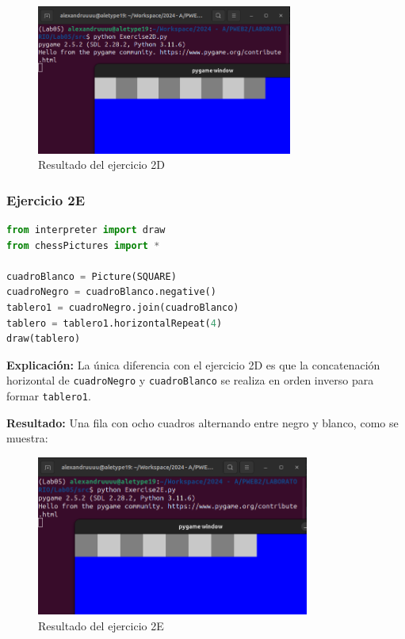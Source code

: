 \documentclass{article}
\begin{document}
\begin{itemize}
\begin{figure}[H]
    \centering
    \includegraphics[width=0.75\textwidth]{img/4.png}
    \caption{Resultado del ejercicio 2D}
    \label{fig:ejercicio2d}
\end{figure}

\subsubsection{Ejercicio 2E}

\begin{lstlisting}[language=Python, caption={Código del ejercicio 2E}]
from interpreter import draw
from chessPictures import *

cuadroBlanco = Picture(SQUARE)
cuadroNegro = cuadroBlanco.negative()
tablero1 = cuadroNegro.join(cuadroBlanco)
tablero = tablero1.horizontalRepeat(4)
draw(tablero)
\end{lstlisting}

\textbf{Explicación:}
La única diferencia con el ejercicio 2D es que la concatenación horizontal de \texttt{cuadroNegro} y \texttt{cuadroBlanco} se realiza en orden inverso para formar \texttt{tablero1}.

\textbf{Resultado:}
Una fila con ocho cuadros alternando entre negro y blanco, como se muestra:

\begin{figure}[H]
    \centering
    \includegraphics[width=0.8\textwidth]{img/5.png}
    \caption{Resultado del ejercicio 2E}
    \label{fig:ejercicio2e}
\end{figure}



\end{itemize}
\end{document}
